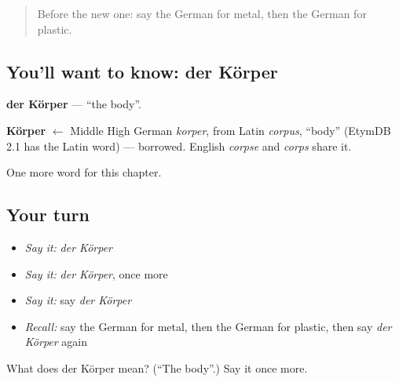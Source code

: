\label{lesson:GE-C204-koerper}



\begin{quote}
Before the new one: say the German for metal, then the German for plastic.
\end{quote}

\subsection*{You'll want to know: der Körper}
\textbf{der Körper} — \textquotedblleft{}the body\textquotedblright{}.

\begin{cousinweb}
\textbf{Körper} $\leftarrow$ Middle High German \emph{korper}, from Latin \emph{corpus}, \textquotedblleft{}body\textquotedblright{} (EtymDB 2.1 has the Latin word) — borrowed. English \emph{corpse} and \emph{corps} share it.
\end{cousinweb}

\begin{grammarlens}[title={What you've built}]
One more word for this chapter.
\end{grammarlens}

\subsection*{Your turn}
\begin{itemize}
\raggedright
  \item \emph{Say it:} \emph{der Körper}
  \item \emph{Say it:} \emph{der Körper}, once more
  \item \emph{Say it:} say \emph{der Körper}
  \item \emph{Recall:} say the German for metal, then the German for plastic, then say \emph{der Körper} again
\end{itemize}

\begin{tcolorbox}[breakable,colback=teal!4,colframe=teal!35!black,title={Before you move on}]
What does der Körper mean? (\textquotedblleft{}The body\textquotedblright{}.) Say it once more.
\end{tcolorbox}
